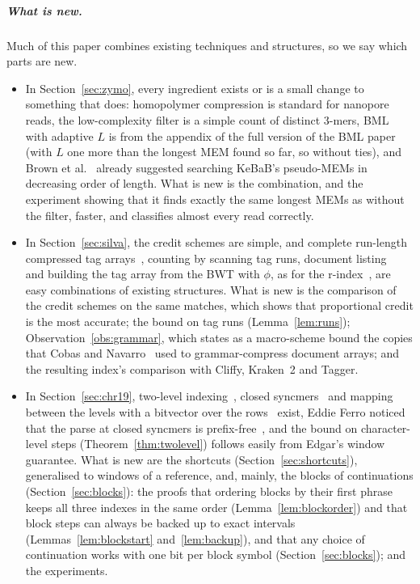 \subparagraph*{What is new.}
Much of this paper combines existing techniques and structures, so we say which parts are new.
\begin{itemize}
\item In Section~\ref{sec:zymo}, every ingredient exists or is a small change to something that does: homopolymer compression is standard for nanopore reads, the low-complexity filter is a simple count of distinct 3-mers, BML with adaptive $L$ is from the appendix of the full version of the BML paper~\cite{Gag24arxiv} (with $L$ one more than the longest MEM found so far, so without ties), and Brown et al.~\cite{BrownEtAl2025KeBaB} already suggested searching KeBaB's pseudo-MEMs in decreasing order of length.
What is new is the combination, and the experiment showing that it finds exactly the same longest MEMs as without the filter, faster, and classifies almost every read correctly.
\item In Section~\ref{sec:silva}, the credit schemes are simple, and complete run-length compressed tag arrays~\cite{BalazEtAl2024}, counting by scanning tag runs, document listing~\cite{Mut02} and building the tag array from the BWT with $\phi$, as for the r-index~\cite{GagieNavarroPrezza2020}, are easy combinations of existing structures.
What is new is the comparison of the credit schemes on the same matches, which shows that proportional credit is the most accurate; the bound on tag runs (Lemma~\ref{lem:runs}); Observation~\ref{obs:grammar}, which states as a macro-scheme bound the copies that Cobas and Navarro~\cite{CN19} used to grammar-compress document arrays; and the resulting index's comparison with Cliffy, Kraken~2 and Tagger.
\item In Section~\ref{sec:chr19}, two-level indexing~\cite{BrownEtAlRLCSA,HongEtAl2024,DengEtAl2022}, closed syncmers~\cite{Edgar2021} and mapping between the levels with a bitvector over the rows~\cite{BrownEtAlRLCSA} exist, Eddie Ferro noticed that the parse at closed syncmers is prefix-free~\cite{FerroPC}, and the bound on character-level steps (Theorem~\ref{thm:twolevel}) follows easily from Edgar's window guarantee.
What is new are the shortcuts (Section~\ref{sec:shortcuts}), generalised to windows of a reference, and, mainly, the blocks of continuations (Section~\ref{sec:blocks}): the proofs that ordering blocks by their first phrase keeps all three indexes in the same order (Lemma~\ref{lem:blockorder}) and that block steps can always be backed up to exact intervals (Lemmas~\ref{lem:blockstart} and~\ref{lem:backup}), and that any choice of continuation works with one bit per block symbol (Section~\ref{sec:blocks}); and the experiments.
\end{itemize}

